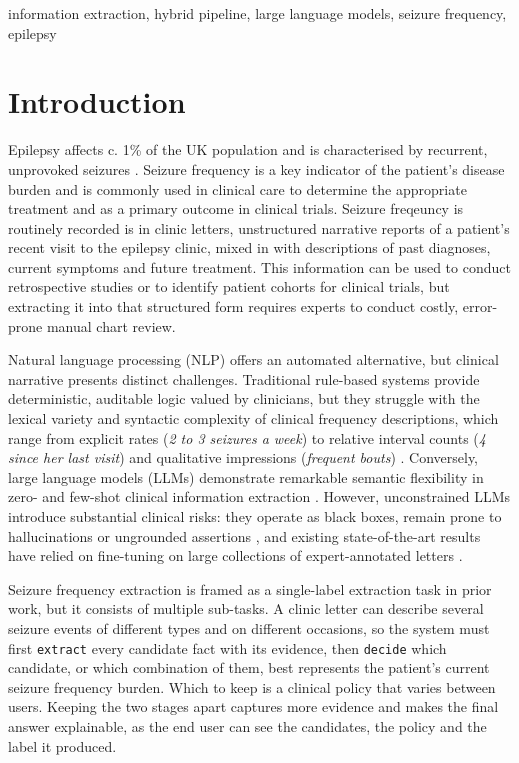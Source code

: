 \documentclass[conference]{IEEEtran}
\begin{document}
\begin{IEEEkeywords}
information extraction, hybrid pipeline, large language models, seizure frequency, epilepsy
\end{IEEEkeywords}

\section{Introduction}

Epilepsy affects c. 1\% of the UK population \cite{b1} and is 
characterised by recurrent, unprovoked seizures \cite{b2}. 
Seizure frequency is a key indicator of the patient's disease
burden and is commonly used in clinical care to determine 
the appropriate treatment and as a primary outcome in 
clinical trials. Seizure freqeuncy is routinely recorded is in 
clinic letters, unstructured narrative reports of a patient's
recent visit to the epilepsy clinic, mixed in with descriptions 
of past diagnoses, current symptoms 
and future treatment. This information can be used to 
conduct retrospective studies or to identify patient cohorts 
for clinical trials, but extracting it into that structured form 
requires experts to conduct costly, error-prone manual 
chart review. 

Natural language processing (NLP) offers an automated 
alternative, but clinical narrative presents distinct challenges. 
Traditional rule-based systems provide deterministic, 
auditable logic valued by clinicians, but they struggle with the 
lexical variety and syntactic complexity of clinical frequency 
descriptions, which range from explicit rates (\emph{2 to 3 
seizures a week}) to relative interval counts 
(\emph{4 since her last visit}) and qualitative impressions 
(\emph{frequent bouts}) \cite{b3}. Conversely, large language 
models (LLMs) demonstrate remarkable semantic flexibility 
in zero- and few-shot clinical information extraction \cite{b11, b12}. 
However, unconstrained LLMs introduce substantial clinical 
risks: they operate as black boxes, remain prone to 
hallucinations or ungrounded assertions \cite{b5}, and 
existing state-of-the-art results have relied on fine-tuning on 
large collections of expert-annotated letters \cite{b3}.

Seizure frequency extraction is framed as a single-label
extraction task in prior work\cite{b3}, but it consists of
multiple sub-tasks. A clinic letter can describe several 
seizure events of different types and on different 
occasions, so the system must first \texttt{extract} every 
candidate fact with its evidence, then \texttt{decide} which 
candidate, or which combination of them, best represents
the patient's current seizure frequency burden. Which to 
keep is a clinical policy that varies between users. Keeping 
the two stages apart captures more evidence and makes the 
final answer explainable, as the end user can see 
the candidates, the policy and the label it produced. 
\end{document}

